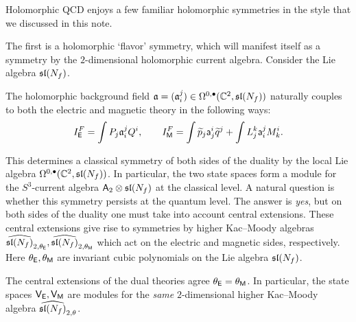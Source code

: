 \documentclass[11pt]{amsart}
\def\sfa{\mathsf{a}}
\begin{document}
Holomorphic QCD enjoys a few familiar holomorphic symmetries in the style that we discussed in this note.

The first is a holomorphic `flavor' symmetry, which will manifest itself as a symmetry by the $2$-dimensional holomorphic current algebra. 
Consider the Lie algebra $\sl(N_f)$. 

The holomorphic background field $\fa = (\fa_i^j) \in \Omega^{0,\bu}(\CC^2 , \sl(N_f))$ naturally couples to both the electric and magnetic theory in the following ways:
\[
I^F_\sfE = \int P_j \fa_i^j Q^i , \qquad I^F_\sfM = \int \Tilde{p}_j \sfa_j^i \Tilde{q}^j + \int L^k_j \sfa_i^j M^i_k . 
\]

This determines a classical symmetry of both sides of the duality by the local Lie algebra $\Omega^{0,\bu}(\CC^2, \sl(N_f))$. 
In particular, the two state spaces form a module for the $S^3$-current algebra $\sfA_2 \otimes \sl(N_f)$ at the classical level.
A natural question is whether this symmetry persists at the quantum level. 
The answer is {\em yes}, but on both sides of the duality one must take into account central extensions.
These central extensions give rise to symmetries by higher Kac--Moody algebras $\Hat{\sl(N_f)}_{2,\theta_{\sfE}}, \Hat{\sl(N_f)}_{2,\theta_{\sfM}}$ which act on the electric and magnetic sides, respectively.
Here $\theta_\sfE, \theta_\sfM$ are invariant cubic polynomials on the Lie algebra $\sl(N_f)$. 

\begin{prop}
The central extensions of the dual theories agree $\theta_\sfE = \theta_\sfM$. 
In particular, the state spaces $\sfV_\sfE, \sfV_\sfM$ are modules for the {\em same} $2$-dimensional higher Kac--Moody algebra $\Hat{\sl(N_f)}_{2,\theta}$.
\end{prop}
\end{document}
